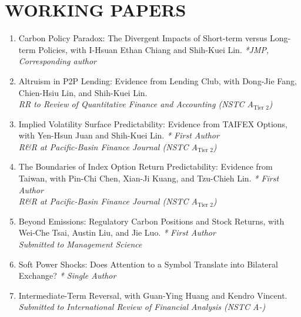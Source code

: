 \documentclass[12pt, letterpaper]{article}
\begin{document}
    \section{WORKING PAPERS}

    \begin{enumerate}
        \item Carbon Policy Paradox: The Divergent Impacts of Short-term versus Long-term Policies, with I-Hsuan Ethan Chiang and Shih-Kuei Lin. \textit{*JMP, Corresponding author}
        
        \item Altruism in P2P Lending: Evidence from Lending Club, with Dong-Jie Fang, Chien-Hsiu Lin, and Shih-Kuei Lin. \\ \textit{RR to Review of Quantitative Finance and Accounting (NSTC A$_\text{Tier 2}$)}

        \item Implied Volatility Surface Predictability: Evidence from TAIFEX Options, with Yen-Hsun Juan and Shih-Kuei Lin. \textit{* First Author}
        \\ \textit{R\&R at Pacific-Basin Finance Journal (NSTC A$_\text{Tier 2}$)}

        \item The Boundaries of Index Option Return Predictability: Evidence from Taiwan, with Pin-Chi Chen, Xian-Ji Kuang, and Tzu-Chieh Lin. \textit{* First Author}
        \\ \textit{R\&R at Pacific-Basin Finance Journal (NSTC A$_\text{Tier 2}$)}

        \item Beyond Emissions: Regulatory Carbon Positions and Stock Returns, with Wei-Che Tsai, Austin Liu, and Jie Luo. \textit{* First Author}
        \\ \textit{Submitted to Management Science}

        \item Soft Power Shocks: Does Attention to a Symbol Translate into Bilateral Exchange? \textit{* Single Author}

        \item Intermediate-Term Reversal, with Guan-Ying Huang and Kendro Vincent.
        \\ \textit{Submitted to International Review of Financial Analysis (NSTC A-)}
        

\end{enumerate}
\end{document}
